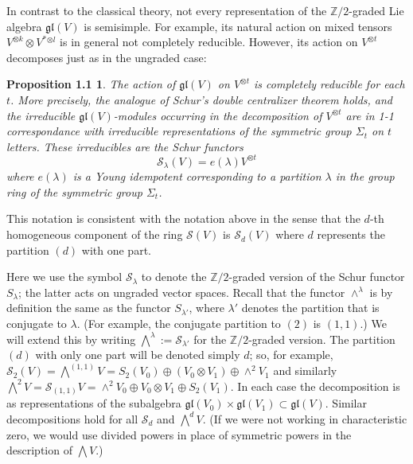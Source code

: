 \documentclass{tran-l}
\theoremstyle{plain}
\newtheorem*{theorem3}{Proposition 1.1}
\theoremstyle{remark}
\theoremstyle{definition}
\newcommand{\gl}{{\mathfrak {gl}}}
\newcommand{\myS}{{\mathcal S}}
\newcommand{\ZZ}{\mathbb {Z}}
\begin{document}
In contrast to the classical theory, not every representation of the
$\ZZ /2$-graded Lie algebra $\gl (V)$ is
semisimple. For example, its natural action on mixed tensors $V^{\otimes k}\otimes V^{*}{}^{\otimes l}$ is in
general not completely reducible. However, its action on
$V^{\otimes t}$ decomposes just as in the ungraded case:

\begin{theorem3} The action of $\gl (V)$ on $V^{\otimes t}$ is
completely reducible for each $t$.
More precisely, the analogue of Schur's double centralizer theorem holds,
and the irreducible $\gl (V)$-modules
occurring in the decomposition of $V^{\otimes t}$  are in \textup{1-1}
correspondance with irreducible representations of
the symmetric group $\Sigma _{t}$ on $t$ letters. These irreducibles are the Schur
functors
\begin{equation*}\myS _{\lambda }(V) = e(\lambda )V^{\otimes t}\end{equation*}
where $e(\lambda )$ is a Young idempotent corresponding to a partition
$\lambda $ in the group ring of the
symmetric group $\Sigma _{t}$.
\end{theorem3}


This notation is consistent with the notation above in the sense that the $d$-th
homogeneous component of the ring $\myS (V)$ is $\myS _{d} (V)$ where $d$ represents the
partition $(d)$ with one part.

Here we use the symbol $\myS _{\lambda }$ to denote the $\ZZ /2$-graded
version of the Schur functor $S_{\lambda }$; the latter acts on ungraded vector
spaces. Recall that the functor $\wedge ^{\lambda }$ is by definition the same
as the functor $S_{\lambda '}$, where $\lambda '$ denotes the partition
that is conjugate to $\lambda $. (For example, the
conjugate partition to $(2)$ is $(1,1)$.)
We will extend this by writing
$\bigwedge ^{\lambda }:= \myS _{\lambda '}$ for the $\ZZ /2$-graded version.
The partition $(d)$ with only one part will be denoted simply $d$; so,
for example,
$\myS _{2}(V)=\bigwedge ^{(1,1)}V=S_{2}(V_{0})\oplus (V_{0}\otimes V_{1})\oplus \wedge ^{2}V_{1}$ and similarly
$\bigwedge ^{2}V=\myS _{(1,1)}V=\wedge ^{2}V_{0}\oplus V_{0}\otimes V_{1}\oplus S_{2}(V_{1})$.
In each case the decomposition is as representations of the subalgebra
$\gl (V_{0})\times \gl (V_{1})\subset \gl (V)$. Similar decompositions hold for
all $\myS _{d}$ and $\bigwedge ^{d}V$. (If we were not working in
characteristic zero, we would use divided powers in place of
symmetric powers in the description
of $\bigwedge V$.)
\end{document}

